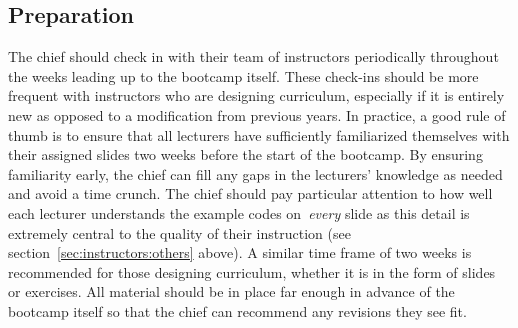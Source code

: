 \subsection{Preparation}
\label{sec:timeline:prep}
\noindent
The chief should check in with their team of instructors periodically
throughout the weeks leading up to the bootcamp itself.
These check-ins should be more frequent with instructors who are designing
curriculum, especially if it is entirely new as opposed to a modification from
previous years.
In practice, a good rule of thumb is to ensure that all lecturers have
sufficiently familiarized themselves with their assigned slides two weeks
before the start of the bootcamp.
By ensuring familiarity early, the chief can fill any gaps in the lecturers'
knowledge as needed and avoid a time crunch.
The chief should pay particular attention to how well each lecturer understands
the example codes on~\textit{every} slide as this detail is extremely central
to the quality of their instruction (see section~\ref{sec:instructors:others}
above).
A similar time frame of two weeks is recommended for those designing
curriculum, whether it is in the form of slides or exercises.
All material should be in place far enough in advance of the bootcamp itself so
that the chief can recommend any revisions they see fit.

